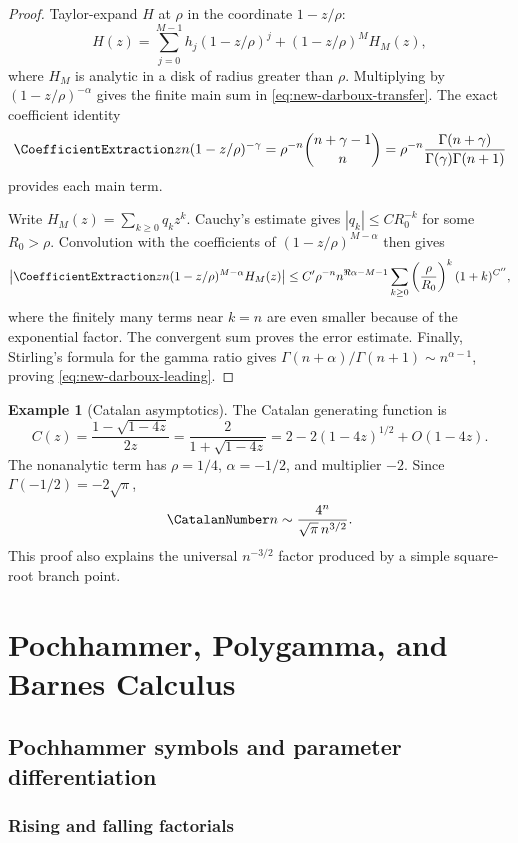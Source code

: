 \documentclass[11pt,a4paper,oneside,openany]{book}
\theoremstyle{definition}
\newtheorem{example}[theorem]{Example}
\theoremstyle{remark}
\begin{document}
\begin{proof}
Taylor-expand $H$ at $\rho$ in the coordinate $1-z/\rho$:
\[
 H(z)=\sum_{j=0}^{M-1}h_j(1-z/\rho)^j
 +(1-z/\rho)^M H_M(z),
\]
where $H_M$ is analytic in a disk of radius greater than $\rho$.  Multiplying
by $(1-z/\rho)^{-\alpha}$ gives the finite main sum in
\eqref{eq:new-darboux-transfer}.  The exact coefficient identity
\[
 \CoefficientExtraction z n(1-z/\rho)^{-\gamma}
 =\rho^{-n}\binom{n+\gamma-1}{n}
 =\rho^{-n}\frac{\Gamma(n+\gamma)}
 {\Gamma(\gamma)\Gamma(n+1)}
\]
provides each main term.

Write $H_M(z)=\sum_{k\ge0}q_kz^k$.  Cauchy's estimate gives
$|q_k|\le C R_0^{-k}$ for some $R_0>\rho$.  Convolution with the coefficients
of $(1-z/\rho)^{M-\alpha}$ then gives
\[
 \left|\CoefficientExtraction z n(1-z/\rho)^{M-\alpha}H_M(z)\right|
 \le C'\rho^{-n}n^{\Re\alpha-M-1}
 \sum_{k\ge0}\left(\frac{\rho}{R_0}\right)^k(1+k)^{C''},
\]
where the finitely many terms near $k=n$ are even smaller because of the
exponential factor.  The convergent sum proves the error estimate.  Finally,
Stirling's formula for the gamma ratio gives
$\Gamma(n+\alpha)/\Gamma(n+1)\sim n^{\alpha-1}$, proving
\eqref{eq:new-darboux-leading}.
\end{proof}

\begin{example}[Catalan asymptotics]
The Catalan generating function is
\[
 C(z)=\frac{1-\sqrt{1-4z}}{2z}
 =\frac{2}{1+\sqrt{1-4z}}
 =2-2(1-4z)^{1/2}+O(1-4z).
\]
The nonanalytic term has $\rho=1/4$, $\alpha=-1/2$, and multiplier $-2$.
Since $\Gamma(-1/2)=-2\sqrt\pi$,
\begin{equation}\label{eq:new-catalan-asymptotic}
 \CatalanNumber n\sim\frac{4^n}{\sqrt\pi\,n^{3/2}}.
\end{equation}
This proof also explains the universal $n^{-3/2}$ factor produced by a simple
square-root branch point.
\end{example}

\part{Pochhammer, Polygamma, and Barnes Calculus}
\label{part:special-functions}

\chapter{Pochhammer symbols and parameter differentiation}
\label{ch:pochhammer}

\section{Rising and falling factorials}
\end{document}
